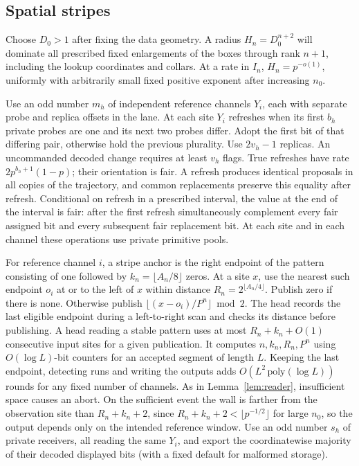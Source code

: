 \subsection{Spatial stripes}\label{sec:stripes}

Choose \(D_0>1\) after fixing the data geometry. A radius \(H_n=D_0^{n+2}\) will dominate all prescribed fixed enlargements of the boxes through rank \(n+1\), including the lookup coordinates and collars. At a rate in \(I_n\), \(H_n=p^{-o(1)}\), uniformly with arbitrarily small fixed positive exponent after increasing \(n_0\).

Use an odd number \(m_h\) of independent reference channels \(Y_i\), each with separate probe and replica offsets in the lane. At each site \(Y_i\) refreshes when its first \(b_h\) private probes are one and its next two probes differ. Adopt the first bit of that differing pair, otherwise hold the previous plurality. Use \(2v_h-1\) replicas. An uncommanded decoded change requires at least \(v_h\) flags. True refreshes have rate \(2p^{b_h+1}(1-p)\); their orientation is fair. A refresh produces identical proposals in all copies of the trajectory, and common replacements preserve this equality after refresh. Conditional on refresh in a prescribed interval, the value at the end of the interval is fair: after the first refresh simultaneously complement every fair assigned bit and every subsequent fair replacement bit. At each site and in each channel these operations use private primitive pools.

For reference channel \(i\), a stripe anchor is the right endpoint of the pattern consisting of one followed by \(k_n=\lfloor A_n/8\rfloor\) zeros. At a site \(x\), use the nearest such endpoint \(o_i\) at or to the left of \(x\) within distance \(R_n=2^{\lfloor A_n/4\rfloor}\). Publish zero if there is none. Otherwise publish \(\lfloor(x-o_i)/P^n\rfloor\bmod2\). The head records the last eligible endpoint during a left-to-right scan and checks its distance before publishing. A head reading a stable pattern uses at most \(R_n+k_n+O(1)\) consecutive input sites for a given publication. It computes \(n,k_n,R_n,P^n\) using \(O(\log L)\)-bit counters for an accepted segment of length \(L\). Keeping the last endpoint, detecting runs and writing the outputs adds \(O(L^2\,\mathrm{poly}(\log L))\) rounds for any fixed number of channels. As in Lemma~\ref{lem:reader}, insufficient space causes an abort. On the sufficient event the wall is farther from the observation site than \(R_n+k_n+2\), since \(R_n+k_n+2<\lfloor p^{-1/2}\rfloor\) for large \(n_0\), so the output depends only on the intended reference window. Use an odd number \(s_h\) of private receivers, all reading the same \(Y_i\), and export the coordinatewise majority of their decoded displayed bits (with a fixed default for malformed storage).

